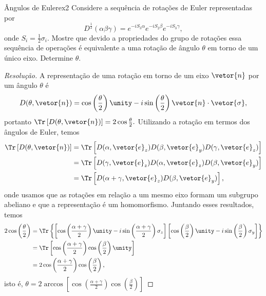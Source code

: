 \begin{exercício}{Ângulos de Euler}{ex2}
    Considere a sequência de rotações de Euler representadas por
    \begin{equation*}
        D^{\frac12}(\alpha \beta \gamma) = e^{-iS_3 \alpha} e^{-i S_2 \beta} e^{-i S_3 \gamma},
    \end{equation*}
    onde \(S_{i} = \frac12 \sigma_i.\) Mostre que devido a propriedades do grupo de rotações essa sequência de operações é equivalente a uma rotação de ângulo \(\theta\) em torno de um único eixo. Determine \(\theta\).
\end{exercício}
\begin{proof}[Resolução]
    A representação de uma rotação em torno de um eixo \(\vetor{n}\) por um ângulo \(\theta\) é
    \begin{equation*}
        D(\theta, \vetor{n}) = \cos\left(\frac\theta2\right) \unity - i\sin\left(\frac\theta2\right) \vetor{n}\cdot \vetor{\sigma},
    \end{equation*}
    portanto \(\Tr\left[D(\theta, \vetor{n})\right] = 2 \cos\frac\theta2.\) Utilizando a rotação em termos dos ângulos de Euler, temos
    \begin{align*}
        \Tr\left[D(\theta, \vetor{n})\right] &= \Tr\left[D(\alpha, \vetor{e}_z) D(\beta, \vetor{e}_y) D(\gamma, \vetor{e}_z)\right]\\
                                             &= \Tr\left[D(\gamma, \vetor{e}_z) D(\alpha, \vetor{e}_z) D(\beta, \vetor{e}_y)\right]\\
                                             &= \Tr\left[D(\alpha + \gamma, \vetor{e}_z)D(\beta, \vetor{e}_y)\right],
    \end{align*}
    onde usamos que as rotações em relação a um mesmo eixo formam um subgrupo abeliano e que a representação é um homomorfismo. Juntando esses resultados, temos
    \begin{align*}
        2\cos\left(\frac\theta2\right) &= \Tr\left\{\left[\cos\left(\frac{\alpha + \gamma}{2}\right)\unity - i \sin\left(\frac{\alpha + \gamma}2\right) \sigma_z\right]\left[\cos\left(\frac\beta2\right) \unity - i \sin\left(\frac\beta2\right) \sigma_y\right]\right\}\\
                          &= \Tr\left[\cos\left(\frac{\alpha + \gamma}{2}\right) \cos\left(\frac\beta2\right) \unity\right]\\
                          &= 2 \cos\left(\frac{\alpha + \gamma}2\right) \cos\left(\frac{\beta}{2}\right),
    \end{align*}
    isto é, \(\theta = 2\arccos\left[\cos\left(\frac{\alpha + \gamma}2\right)\cos\left(\frac{\beta}{2}\right)\right]\)
\end{proof}
